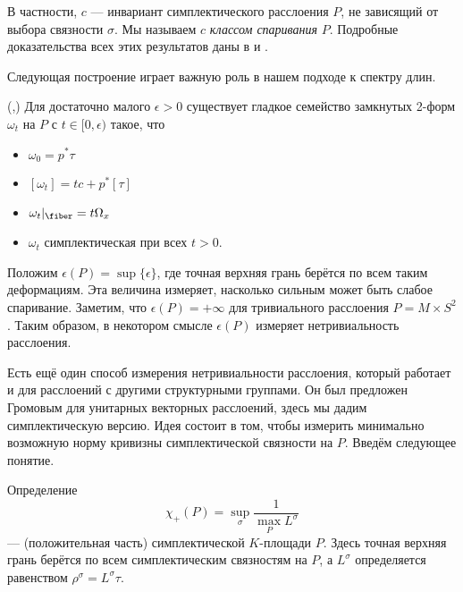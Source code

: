 В частности, $c$ --- инвариант симплектического расслоения $P$, не зависящий от выбора связности $\sigma$.
Мы называем $c$ \emph{классом спаривания} $P$.
Подробные доказательства всех этих результатов даны в \cite{GLS} и \cite{MS}.

Следующая построение играет важную роль в нашем подходе к спектру длин.

(\cite{GLS},\cite{MS})
Для достаточно малого $\epsilon > 0$ существует гладкое семейство замкнутых 2-форм $\omega_t$ на $P$ с $t \in [0, \epsilon)$ такое, что
\begin{itemize}
\item $\omega_0 = p^\ast \tau$
\item $[\omega_t] = tc + p^\ast [\tau]$
\item $\omega_t|_\fiber = t\Omega_x$
\item $\omega_t$ симплектическая при всех $t > 0$.
\end{itemize}

Положим $\epsilon(P) = \sup \{\epsilon\}$, где точная верхняя грань берётся по всем таким деформациям.
Эта величина измеряет, насколько сильным может быть слабое спаривание.
Заметим, что $\epsilon(P) = +\infty$ для тривиального расслоения $P = M \times S^2$.
Таким образом, в некотором смысле $\epsilon(P)$ измеряет нетривиальность расслоения.

Есть ещё один способ измерения нетривиальности расслоения, который работает и для расслоений с другими структурными группами.
Он был предложен Громовым \cite{G2} для унитарных векторных расслоений, здесь мы дадим симплектическую версию.
Идея состоит в том, чтобы измерить минимально возможную норму кривизны симплектической связности на $P$.
Введём следующее понятие.

\begin{thm*}{Определение}
\[\chi_+ (P) = \sup_\sigma \frac1{\max_P L^\sigma}\]
--- (положительная часть) симплектической $K$-площади $P$.
Здесь точная верхняя грань берётся по всем симплектическим связностям на $P$, а $L^\sigma$ определяется равенством $\rho^\sigma = L^\sigma \tau$.
\end{thm*}

